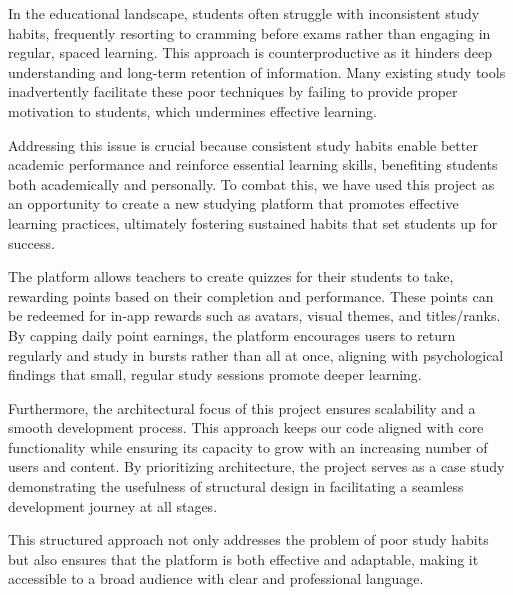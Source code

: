 In the educational landscape, students often struggle with inconsistent study habits, frequently resorting to cramming before exams rather than engaging in regular, spaced learning. This approach is counterproductive as it hinders deep understanding and long-term retention of information. Many existing study tools inadvertently facilitate these poor techniques by failing to provide proper motivation to students, which undermines effective learning. 

Addressing this issue is crucial because consistent study habits enable better academic performance and reinforce essential learning skills, benefiting students both academically and personally. To combat this, we have used this project as an opportunity to create a new studying platform that promotes effective learning practices, ultimately fostering sustained habits that set students up for success. 

The platform allows teachers to create quizzes for their students to take, rewarding points based on their completion and performance. These points can be redeemed for in-app rewards such as avatars, visual themes, and titles/ranks. By capping daily point earnings, the platform encourages users to return regularly and study in bursts rather than all at once, aligning with psychological findings that small, regular study sessions promote deeper learning. 

Furthermore, the architectural focus of this project ensures scalability and a smooth development process. This approach keeps our code aligned with core functionality while ensuring its capacity to grow with an increasing number of users and content. By prioritizing architecture, the project serves as a case study demonstrating the usefulness of structural design in facilitating a seamless development journey at all stages. 

This structured approach not only addresses the problem of poor study habits but also ensures that the platform is both effective and adaptable, making it accessible to a broad audience with clear and professional language.